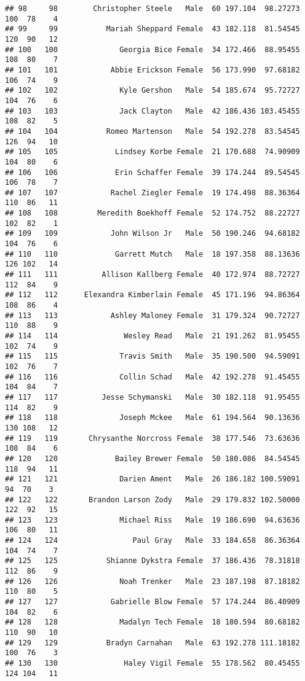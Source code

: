 \documentclass[
]{article}
\begin{document}
\begin{verbatim}
## 98     98        Christopher Steele   Male  60 197.104  98.27273 100  78    4
## 99     99           Mariah Sheppard Female  43 182.118  81.54545 120  90   12
## 100   100              Georgia Bice Female  34 172.466  88.95455 108  80    7
## 101   101            Abbie Erickson Female  56 173.990  97.68182 106  74    9
## 102   102              Kyle Gershon   Male  54 185.674  95.72727 104  76    6
## 103   103              Jack Clayton   Male  42 186.436 103.45455 108  82    5
## 104   104           Romeo Martenson   Male  54 192.278  83.54545 126  94   10
## 105   105             Lindsey Korbe Female  21 170.688  74.90909 104  80    6
## 106   106             Erin Schaffer Female  39 174.244  89.54545 106  78    7
## 107   107            Rachel Ziegler Female  19 174.498  88.36364 110  86   11
## 108   108         Meredith Boekhoff Female  52 174.752  88.22727 102  82    1
## 109   109            John Wilson Jr   Male  50 190.246  94.68182 104  76    6
## 110   110             Garrett Mutch   Male  18 197.358  88.13636 126 102   14
## 111   111          Allison Kallberg Female  40 172.974  88.72727 112  84    9
## 112   112      Elexandra Kimberlain Female  45 171.196  94.86364 108  86    4
## 113   113            Ashley Maloney Female  31 179.324  90.72727 110  88    9
## 114   114               Wesley Read   Male  21 191.262  81.95455 102  74    9
## 115   115              Travis Smith   Male  35 190.500  94.59091 102  76    7
## 116   116              Collin Schad   Male  42 192.278  91.45455 104  84    7
## 117   117          Jesse Schymanski   Male  30 182.118  91.95455 114  82    9
## 118   118              Joseph Mckee   Male  61 194.564  90.13636 130 108   12
## 119   119       Chrysanthe Norcross Female  38 177.546  73.63636 108  84    6
## 120   120             Bailey Brewer Female  50 180.086  84.54545 118  94   11
## 121   121              Darien Ament   Male  26 186.182 100.59091  94  70    3
## 122   122       Brandon Larson Zody   Male  29 179.832 102.50000 122  92   15
## 123   123              Michael Riss   Male  19 186.690  94.63636 106  80   11
## 124   124                 Paul Gray   Male  33 184.658  86.36364 104  74    7
## 125   125           Shianne Dykstra Female  37 186.436  78.31818 112  86    9
## 126   126              Noah Trenker   Male  23 187.198  87.18182 110  80    5
## 127   127            Gabrielle Blow Female  57 174.244  86.40909 104  82    6
## 128   128              Madalyn Tech Female  18 180.594  80.68182 110  90   10
## 129   129           Bradyn Carnahan   Male  63 192.278 111.18182 100  76    3
## 130   130               Haley Vigil Female  55 178.562  80.45455 124 104   11

\end{verbatim}
\end{document}
